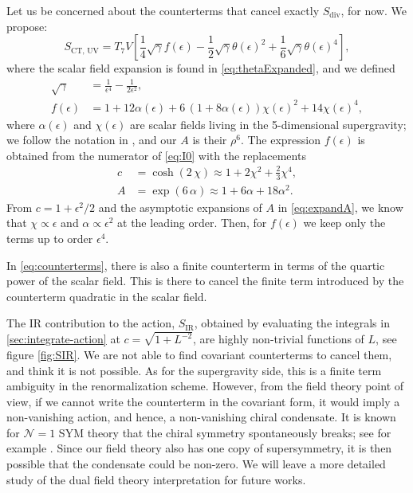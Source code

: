 Let us be concerned about the counterterms that cancel exactly $S_\text{div}$, for now. We propose:
\begin{equation}\label{eq:counterterms}
 S_\text{CT, UV} =  T_7 V \left[ 
  \frac{1}{4} \sqrt{\gamma} f(\epsilon)
   -\frac{1}{2} \sqrt{\gamma} \theta (\epsilon)^2 + \frac{1}{6} \sqrt{\gamma} \theta (\epsilon)^4
   \right],
\end{equation}
where the scalar field expansion is found in \eqref{eq:thetaExpanded}, and we defined
\begin{align}
 \sqrt{\gamma} &= \frac{1}{\epsilon^4}-\frac{1}{2 \epsilon ^2},\\
 f(\epsilon) &= 1 + 12 \alpha(\epsilon) + 6 \,(1 + 8 \alpha(\epsilon )) \chi(\epsilon ) ^2+14 \chi(\epsilon )^4, \label{eq:f}
\end{align}
where $\alpha(\epsilon)$ and $\chi(\epsilon)$ are scalar fields living in the 5-dimensional supergravity; we follow the notation in \cite{Albash:2011nw}, and our $A$ is their $\rho^6$.
The expression $f(\epsilon)$ is obtained from the numerator of \eqref{eq:I0} with the replacements 
\begin{align}
c &= \cosh(2 \, \chi) \approx 1 + 2 \chi ^2 + \frac{2}{3}\chi ^4,\\
A &= \exp{(6 \, \alpha)}\approx 1 + 6 \alpha + 18 \alpha ^2. 
\end{align}
From $c = 1 + \epsilon^2/2$ and the asymptotic expansions of $A$ in \eqref{eq:expandA}, we know that $\chi \propto \epsilon$ and $\alpha \propto \epsilon^2$ at the leading order. Then, for $f(\epsilon)$ we keep only the terms up to order $\epsilon^4$.  

In \eqref{eq:counterterms}, there is also a finite counterterm in terms of the quartic power of the scalar field. This is there to cancel the finite term introduced by the counterterm quadratic in the scalar field. 

The IR contribution to the action, $S_\text{IR}$, obtained by evaluating the integrals in \ref{sec:integrate-action} at $c=\sqrt{1+L^{-2}}$, are highly non-trivial functions of $L$, see figure \ref{fig:SIR}.
We are not able to find covariant counterterms to cancel them, and think it is not possible. 
As for the supergravity side, this is a finite term ambiguity in the renormalization scheme. 
However, from the field theory point of view, if we cannot write the counterterm in the covariant form, it would imply a non-vanishing action, and hence, a non-vanishing chiral condensate. 
It is known for $\mathcal{N}=1$ SYM theory that the chiral symmetry spontaneously breaks; see for example \cite{Bergner:2014saa}. Since our field theory also has one copy of supersymmetry, it is then possible that the condensate could be non-zero. We will leave a more detailed study of the dual field theory interpretation for future works.

